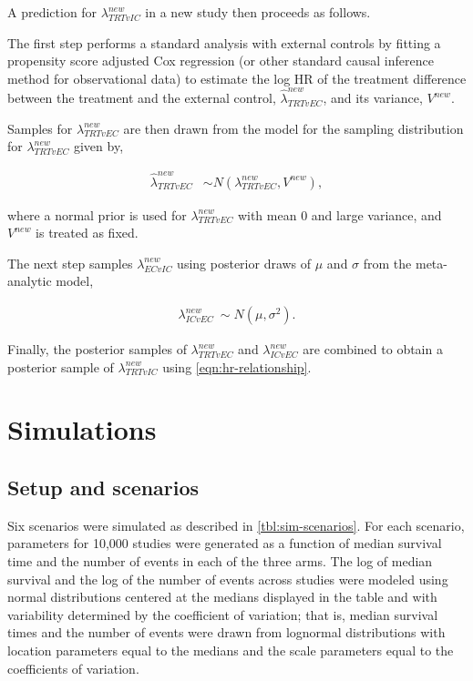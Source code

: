 \documentclass[11pt,final,fleqn]{article}\usepackage[]{graphicx}\usepackage[]{color}
\begin{document}
A prediction for $\lambda_{\textit{TRT}vIC}^{new} $ in a new study then proceeds as follows. 

The first step performs a standard analysis with external controls by fitting a propensity score adjusted Cox regression (or other standard causal inference method for observational data) to estimate the log HR of the treatment difference between the treatment and the external control, $\hat{\lambda}_{\textit{TRT}vEC}^{new}$, and its variance, $V^{new}$.  

Samples for $\lambda_{\textit{TRT}vEC}^{new}$ are then drawn from the model for the sampling distribution for $\lambda_{\textit{TRT}vEC}^{new}$ given by,

\begin{align}
\hat{\lambda}_{\textit{TRT}vEC}^{new} &\sim N(\lambda_{\textit{TRT}vEC}^{new}, V^{new}),
\end{align}

where a normal prior is used for $\lambda_{\textit{TRT}vEC}^{new}$ with mean $0$ and large variance, and $V^{new}$ is treated as fixed. 

The next step samples $\lambda_{ECvIC}^{new}$ using posterior draws of $\mu$ and $\sigma$ from the meta-analytic model,

\begin{align}
\lambda_{ICvEC}^{new} ~ \sim N ( \mu , \sigma^2).
\end{align}

Finally, the posterior samples of $\lambda_{\textit{TRT}vEC}^{new}$ and $\lambda_{ICvEC}^{new}$ are combined to obtain a posterior sample of $\lambda_{\textit{TRT}vIC}^{new}$ using \autoref{eqn:hr-relationship}.


\section{Simulations} \label{sec:simulations}

\subsection{Setup and scenarios}
Six scenarios were simulated as described in \autoref{tbl:sim-scenarios}. For each scenario, parameters for 10,000 studies were generated as a function of median survival time and the number of events in each of the three arms. The log of median survival and the log of the number of events across studies were modeled using normal distributions centered at the medians displayed in the table and with variability determined by the coefficient of variation; that is, median survival times and the number of events were drawn from lognormal distributions with location parameters equal to the medians and the scale parameters equal to the coefficients of variation.
\end{document}
